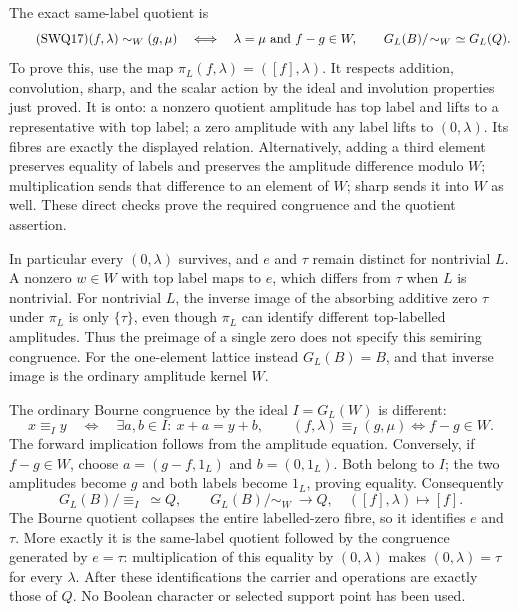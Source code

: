 The exact same-label quotient is
\begin{equation}\tag{SWQ17}
 (f,\lambda)\sim_W(g,\mu)\quad\Longleftrightarrow\quad
 \lambda=\mu\ \hbox{and}\ f-g\in W,
 \qquad G_L(B)/\!\sim_W\ \simeq G_L(Q).
\end{equation}
To prove this, use the map
$\pi_L(f,\lambda)=([f],\lambda)$. It respects addition,
convolution, sharp, and the scalar action by the ideal and
involution properties just proved. It is onto: a nonzero quotient
amplitude has top label and lifts to a representative with top label;
a zero amplitude with any label lifts to $(0,\lambda)$.
Its fibres are exactly the displayed relation. Alternatively, adding
a third element preserves equality of labels and preserves the
amplitude difference modulo $W$; multiplication sends that difference
to an element of $W$; sharp sends it into $W$ as well. These direct
checks prove the required congruence and the quotient assertion.

In particular every $(0,\lambda)$ survives, and $e$ and $\tau$
remain distinct for nontrivial $L$. A nonzero $w\in W$ with top
label maps to $e$, which differs from $\tau$ when $L$ is nontrivial.
For nontrivial $L$, the inverse image of the absorbing
additive zero $\tau$ under $\pi_L$ is only $\{\tau\}$, even though
$\pi_L$ can identify different top-labelled amplitudes. Thus the
preimage of a single zero does not specify this semiring congruence.
For the one-element lattice instead $G_L(B)=B$, and that inverse
image is the ordinary amplitude kernel $W$.

The ordinary Bourne congruence by the ideal $I=G_L(W)$ is different:
\begin{equation}\tag{SWQ18}
 x\equiv_I y\quad\Longleftrightarrow\quad
 \exists a,b\in I:\ x+a=y+b,
 \qquad
 (f,\lambda)\equiv_I(g,\mu)\Longleftrightarrow f-g\in W.
\end{equation}
The forward implication follows from the amplitude equation.
Conversely, if $f-g\in W$, choose
$a=(g-f,1_L)$ and $b=(0,1_L)$. Both belong to $I$; the two
amplitudes become $g$ and both labels become $1_L$, proving equality.
Consequently
\begin{equation}\tag{SWQ19}
 G_L(B)/\!\equiv_I\ \simeq Q,
 \qquad
 G_L(B)/\!\sim_W\ \longrightarrow Q,
 \quad([f],\lambda)\longmapsto[f].
\end{equation}
The Bourne quotient collapses the entire labelled-zero fibre, so it
identifies $e$ and $\tau$. More exactly it is the same-label quotient
followed by the congruence generated by $e=\tau$: multiplication
of this equality by $(0,\lambda)$ makes $(0,\lambda)=\tau$ for
every $\lambda$. After these identifications the carrier and
operations are exactly those of $Q$. No Boolean character or
selected support point has been used.

